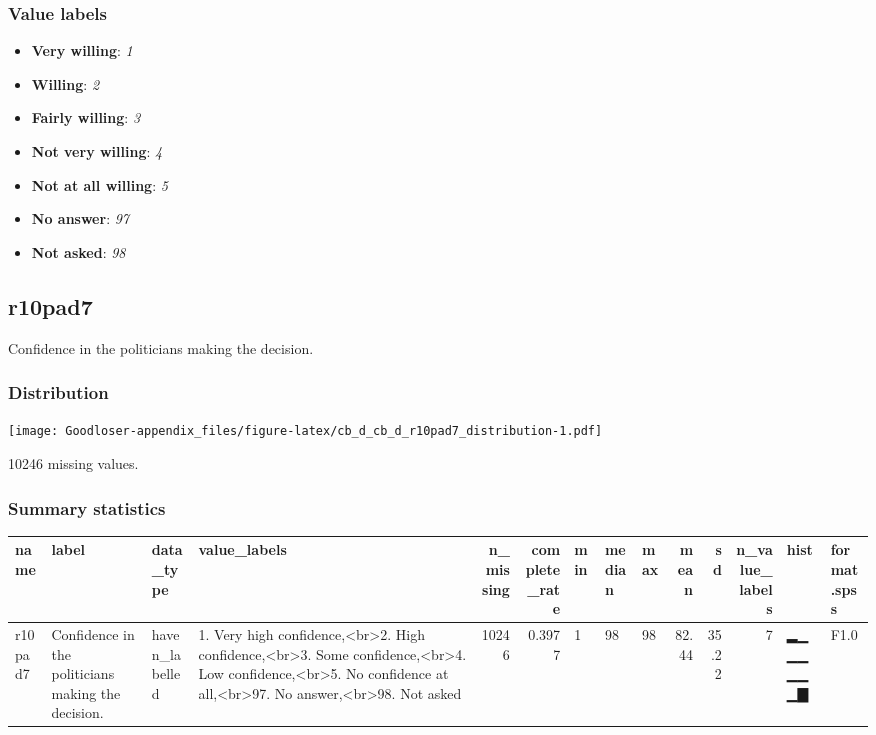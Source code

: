 \documentclass[
]{book}
\providecommand{\tightlist}{%
  \setlength{\itemsep}{0pt}\setlength{\parskip}{0pt}}
\begin{document}
\hypertarget{r10pad6_labels}{%
\subsubsection{Value labels}\label{r10pad6_labels}}

\begin{itemize}
\tightlist
\item
  \textbf{Very willing}: \emph{1}
\item
  \textbf{Willing}: \emph{2}
\item
  \textbf{Fairly willing}: \emph{3}
\item
  \textbf{Not very willing}: \emph{4}
\item
  \textbf{Not at all willing}: \emph{5}
\item
  \textbf{No answer}: \emph{97}
\item
  \textbf{Not asked}: \emph{98}
\end{itemize}

\hypertarget{r10pad7}{%
\subsection{r10pad7}\label{r10pad7}}

Confidence in the politicians making the decision.

\hypertarget{r10pad7_distribution}{%
\subsubsection{Distribution}\label{r10pad7_distribution}}

\texttt{[image: Goodloser-appendix\_files/figure-latex/cb\_d\_cb\_d\_r10pad7\_distribution-1.pdf]}

10246 missing values.

\hypertarget{r10pad7_summary}{%
\subsubsection{Summary statistics}\label{r10pad7_summary}}

\begin{tabular}{l|l|l|l|r|r|l|l|l|r|r|r|l|l}
\hline
name & label & data_type & value_labels & n_missing & complete_rate & min & median & max & mean & sd & n_value_labels & hist & format.spss\\
\hline
r10pad7 & Confidence in the politicians making the decision. & haven_labelled & 1. Very high confidence,<br>2. High confidence,<br>3. Some confidence,<br>4. Low confidence,<br>5. No confidence at all,<br>97. No answer,<br>98. Not asked & 10246 & 0.3977 & 1 & 98 & 98 & 82.44 & 35.22 & 7 & ▂▁▁▁▁▁▁▇ & F1.0\\
\hline
\end{tabular}
\end{document}
